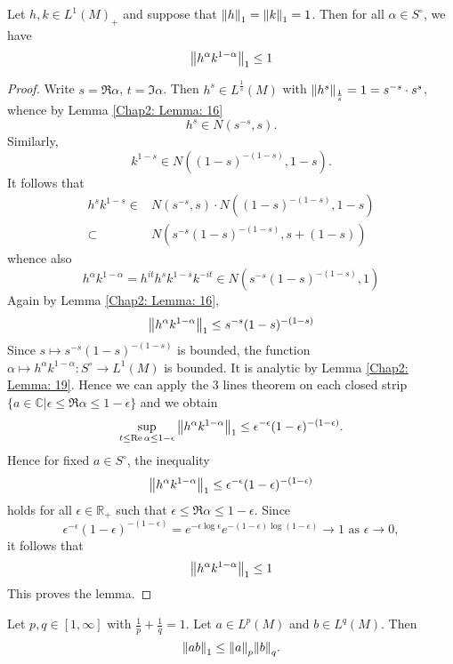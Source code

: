 \begin{lemma}\label{Chap2: Lemma: 22}
    Let $h,k\in L^1(M)_+$ and suppose that $\norm{h}_1=\norm{k}_1=1$. Then for all $\alpha\in S^\circ$, we have
    \[
        \norm{h^\alpha k^{1-\alpha}}_1\leq 1
    \]
\end{lemma}
\begin{proof}
    Write $s=\Re \alpha$, $t=\Im \alpha$. Then $h^s\in L^\frac{1}{s}(M)$ with $\norm{h^s}_{\frac{1}{s}}=1=s^{-s}\cdot s^s$, whence by Lemma \ref{Chap2: Lemma: 16}
    \[
        h^s\in N(s^{-s},s).
    \]
    Similarly,
    \[
        k^{1-s}\in N((1-s)^{-(1-s)},1-s).
    \]
    It follows that
    \[
        \begin{split}
            h^s k^{1-s}\in& N(s^{-s},s)\cdot N((1-s)^{-(1-s)},1-s)\\
            \subset& N(s^{-s}(1-s)^{-(1-s)},s+(1-s))
        \end{split}
    \]
    whence also
    \[
        h^\alpha k^{1-\alpha}=h^{it}h^s k^{1-s}k^{-it}\in N(s^{-s}(1-s)^{-(1-s)},1)
    \]
    Again by Lemma \ref{Chap2: Lemma: 16},
    \[
        \norm{h^\alpha k^{1-\alpha}}_1\leq s^{-s}(1-s)^{-(1-s)}
    \]
    Since $s\mapsto s^{-s}(1-s)^{-(1-s)}$ is bounded, the function $\alpha\mapsto h^\alpha k^{1-\alpha}:S^\circ \to L^1(M)$ is bounded. It is analytic by Lemma \ref{Chap2: Lemma: 19}. Hence we can apply the 3 lines theorem on each closed strip $\{a\in \mathbb{C}|\epsilon\leq \Re \alpha\leq 1-\epsilon\}$ and we obtain
    \[
        \sup_{t\leq \Re \alpha\leq 1-\epsilon}\norm{h^\alpha k^{1-\alpha}}_1\leq \epsilon^{-\epsilon}(1-\epsilon)^{-(1-\epsilon)}.
    \]
    Hence for fixed $a\in S^\circ$, the inequality
    \[
        \norm{h^\alpha k^{1-\alpha}}_1\leq \epsilon^{-\epsilon}(1-\epsilon)^{-(1-\epsilon)}
    \]
    holds for all $\epsilon\in \mathbb{R}_+$ such that $\epsilon\leq \Re \alpha\leq 1-\epsilon$. Since
    \[
        \epsilon^{-\epsilon}(1-\epsilon)^{-(1-\epsilon)}=e^{-\epsilon\log \epsilon}e^{-(1-\epsilon)\log (1-\epsilon)}\to 1 \text{ as } \epsilon\to 0,
    \]
    it follows that
    \[
        \norm{h^\alpha k^{1-\alpha}}_1\leq 1
    \]
    This proves the lemma.
\end{proof}
\begin{theorem}
    Let $p,q\in [1,\infty]$ with $\frac{1}{p}+\frac{1}{q}=1$. Let $a\in L^p(M)$ and $b\in L^q(M)$. Then
    \[
        \norm{ab}_1\leq \norm{a}_p\norm{b}_q.
    \]
\end{theorem}
